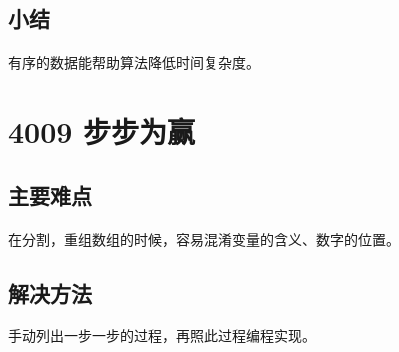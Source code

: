 \documentclass[UTF-8, 12pt]{ctexart}
\begin{document}
    \subsection{小结}
    \paragraph{}
    有序的数据能帮助算法降低时间复杂度。
    
\section{4009 步步为赢}
    \subsection{主要难点}
    \paragraph{}
    在分割，重组数组的时候，容易混淆变量的含义、数字的位置。
    \subsection{解决方法}
  	手动列出一步一步的过程，再照此过程编程实现。
\end{document}
